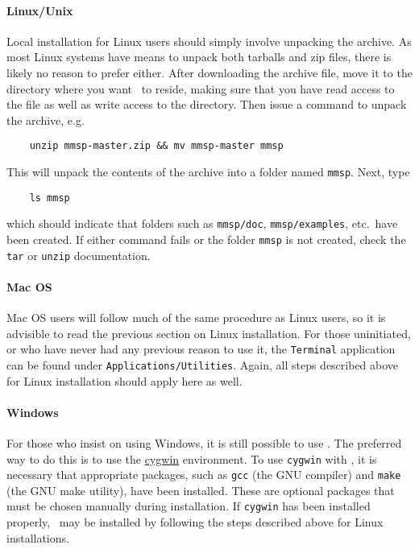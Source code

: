 \paragraph{Linux/Unix}
Local installation for Linux users should simply involve unpacking the archive.  As most Linux systems have means to unpack both tarballs and zip files, there is likely no reason to prefer either.  After downloading the archive file, move it to the directory where you want \MMSP\ to reside, making sure that you have read access to the file as well as write access to the directory.  Then issue a command to unpack the archive, e.g.
\begin{shadebox}
\begin{verbatim}
    unzip mmsp-master.zip && mv mmsp-master mmsp
\end{verbatim}
\end{shadebox}
This will unpack the contents of the archive into a folder named {\tt mmsp}.  Next, type
\begin{shadebox}
\begin{verbatim}
    ls mmsp
\end{verbatim}
\end{shadebox}
which should indicate that folders such as {\tt mmsp/doc}, {\tt mmsp/examples}, etc.~have been created.  If either command fails or the folder {\tt mmsp} is not created, check the {\tt tar} or {\tt unzip} documentation.

\paragraph{Mac OS}
Mac OS users will follow much of the same procedure as Linux users, so it is advisible to read the previous section on Linux installation.  For those uninitiated, or who have never had any previous reason to use it, the {\tt Terminal} application can be found under {\tt Applications/Utilities}.  Again, all steps described above for Linux installation should apply here as well.

\paragraph{Windows}
For those who insist on using Windows, it is still possible to use \MMSP.  The preferred way to do this is to use the \href{http://www.cygwin.com}{cygwin} environment.  To use {\tt cygwin} with \MMSP, it is necessary that appropriate packages, such as {\tt gcc} (the GNU compiler) and {\tt make} (the GNU make utility), have been installed.  These are optional packages that must be chosen manually during installation.  If {\tt cygwin} has been installed properly, \MMSP\ may be installed by following the steps described above for Linux installations.

